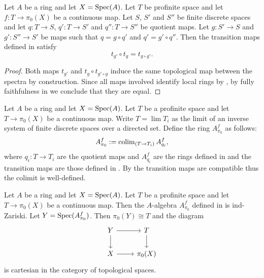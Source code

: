 \begin{lemma}
  \label{thm:modify-pi0-transition-map-compatible}
  Let $A$ be a ring and let $X = \operatorname{Spec} (A)$. Let $T$ be profinite space and let $f : T \to \pi_0(X)$ be a continuous map. Let \(S\), \(S'\) and \(S''\) be finite discrete spaces and let \(q : T \to S\), \(q' : T \to S'\) and \(q'' : T \to S''\) be quotient maps. Let \(g : S' \to S\) and \(g' : S'' \to S'\) be maps such that \(q = g \circ q'\) and \(q' = g' \circ q''\). Then the transition maps defined in  satisfy
  \[t_{g'} \circ t_{g} = t_{g \circ g'}.\]
\end{lemma}

\begin{proof}
  Both maps \(t_{g'}\) and \(t_{g} \circ t_{g' \circ g}\) induce the same topological map between the spectra by construction. Since all maps involved identify local rings by , by fully faithfulness in  we conclude that they are equal.
\end{proof}

\begin{definition}
  \label{def:modify-pi0-profinite}
  Let $A$ be a ring and let $X = \operatorname{Spec} (A)$. Let $T$ be a profinite space and let $T \to \pi_0(X)$ be a continuous map. Write $T = \lim T_i$ as the limit of an inverse system of finite discrete spaces over a directed set. Define the ring \(A^f_{\pi_0}\) as follows:
  \[
    A^f_{\pi_0} := \operatorname{colim}_{(T \to T_i)} A^f_{q_i},
  \]
  where \(q_i : T \to T_i\) are the quotient maps and \(A^f_{q_i}\) are the rings defined in  and the transition maps are those defined in . By  the transition maps are compatible thus the colimit is well-defined.
\end{definition}

\begin{lemma}
  \label{thm:modify-pi0-profinite-properties}
  Let $A$ be a ring and let $X = \operatorname{Spec} (A)$. Let $T$ be a profinite space and let $T \to \pi_0(X)$ be a continuous map. Then the $A$-algebra $A^f_{\pi_0}$ defined in  is ind-Zariski. Let $Y = \operatorname{Spec} (A^f_{\pi_0})$. Then $\pi_0(Y) \cong T$ and the diagram
  \[
  \begin{tikzcd}
  Y \arrow[r] \arrow[d] & T \arrow[d] \\
  X \arrow[r] & \pi_0(X)
  \end{tikzcd}
  \]
  is cartesian in the category of topological spaces.
\end{lemma}

